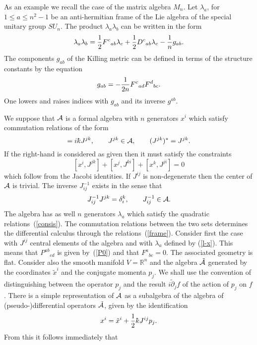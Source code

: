 \documentclass[a4paper,12pt]{article}
\def\p{\partial}
\def\t#1{\tilde #1}
\def\b#1{{\mathbb #1}}
\def\c#1{{\cal #1}}
\def\kbar{{\mathchar'26\mkern-9muk}}
\def\t#1{\tilde #1}
\begin{document}
As an example we recall the case of the matrix algebra $M_n$.  Let
$\lambda_a$, for $1 \leq a \leq n^2-1$ be an anti-hermitian frame of
the Lie algebra of the special unitary group $SU_n$. The product
$\lambda_a \lambda_b$ can be written in the form
\begin{equation}
\lambda_a \lambda_b = {1\over 2} F^c{}_{ab} \lambda_c + {1\over 2}
D^c{}_{ab} \lambda_c - {1 \over n} g_{ab}.  \label{3.1.1}
\end{equation}
The components $g_{ab}$ of the Killing metric can be
defined in terms of the structure constants by the equation
$$
g_{ab} = - {1\over 2n}F^c{}_{ad}F^d{}_{bc}.                  %
$$
One lowers and raises indices with $g_{ab}$ and its inverse $g^{ab}$. 

We suppose that $\c{A}$ is a formal algebra with $n$ generators $x^i$
which satisfy commutation relations of the form
\begin{equation}
[x^j, x^k] = i\kbar J^{jk}, \qquad J^{jk} \in \c{A}, 
\qquad (J^{jk})^* = J^{jk}.                                    \label{c-r}
\end{equation}
If the right-hand is considered as given then it must satisfy the
constraints
$$
[x^i, J^{jk}] + [x^j, J^{ki}] +[x^k, J^{ji}] = 0
$$
which follow from the Jacobi identities.  If $J^{ij}$ is
non-degenerate then the center of $\c{A}$ is trivial. The inverse
$J^{-1}_{ij}$ exists in the sense that
$$
J^{-1}_{ij} J^{jk} = \delta_i^k, \qquad J^{-1}_{ij} \in \c{A}.
$$
The algebra has as well $n$ generators $\lambda_a$ which satisfy
the quadratic relations~(\ref{consis}). The commutation relations
between the two sets determines the differential calculus through the
relations~(\ref{frame}).  Consider first the case with $J^{ij}$
central elements of the algebra and with $\lambda_a$ defined by
(\ref{l-x}). This means that $P^{ab}{}_{cd}$ is given by~(\ref{P0})
and that $F^a{}_{bc} = 0$. The associated geometry is flat.  Consider
also the smooth manifold $V = \b{R}^n$ and the algebra $\t{\c{A}}$
generated by the coordinates $\t{x}^i$ and the conjugate momenta
$p_j$. We shall use the convention of distinguishing between the
operator $p_j$ and the result $i\t{\p}_j f$ of the action of $p_j$ on
$f$. There is a simple representation of $\c{A}$ as a subalgebra of
the algebra of (pseudo-)differential operators $\t{\c{A}}$, given by
the identification
\begin{equation}
x^i = \t{x}^i + \frac 12 \kbar J^{ij} p_j.                 \label{deriv}
\end{equation}
From this it follows immediately that
\end{document}
